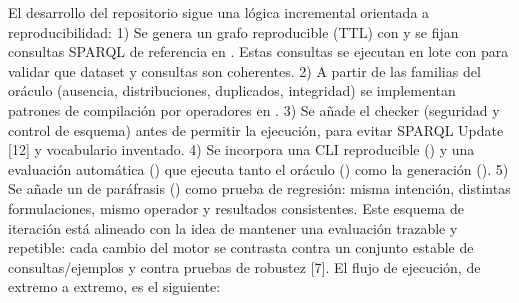 \markdownRendererUlEndTight \markdownRendererInterblockSeparator
{}\markdownRendererInterblockSeparator
{}El desarrollo del repositorio sigue una lógica incremental orientada a reproducibilidad:\markdownRendererInterblockSeparator
{}1)  Se genera un grafo reproducible (TTL) con  y se fijan consultas SPARQL de referencia en . Estas consultas se ejecutan en lote con  para validar que dataset y consultas son coherentes. 2)  A partir de las familias del oráculo (ausencia, distribuciones, duplicados, integridad) se implementan patrones de compilación por operadores en . 3)  Se añade el checker (seguridad y control de esquema) antes de permitir la ejecución, para evitar SPARQL Update [12] y vocabulario inventado. 4)  Se incorpora una CLI reproducible () y una evaluación automática () que ejecuta tanto el oráculo () como la generación (). 5)  Se añade un  de paráfrasis () como prueba de regresión: misma intención, distintas formulaciones, mismo operador y resultados consistentes.\markdownRendererInterblockSeparator
{}Este esquema de iteración está alineado con la idea de mantener una evaluación trazable y repetible: cada cambio del motor se contrasta contra un conjunto estable de consultas/ejemplos y contra pruebas de robustez [7].\markdownRendererInterblockSeparator
{}\markdownRendererInterblockSeparator
{}El flujo de ejecución, de extremo a extremo, es el siguiente:\markdownRendererInterblockSeparator
